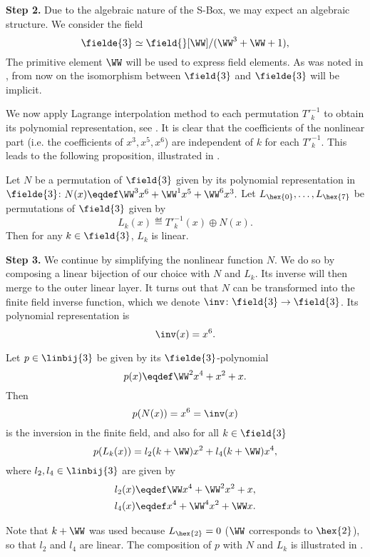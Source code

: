 \textbf{Step 2.}
Due to the algebraic nature of the S-Box, we may expect an algebraic structure. We consider the field
$$
\fielde{3} \simeq \field{}[\WW]/(\WW^3+\WW+1),
$$
The primitive element $\WW$ will be used to express field elements. As was noted in , from now on the isomorphism between $\field{3}$ and $\fielde{3}$ will be implicit.


We now apply Lagrange interpolation method to each permutation $T'^{-1}_k$ to obtain its polynomial representation, see . It is clear that the coefficients of the nonlinear part (i.e. the coefficients of $x^3, x^5, x^6$) are independent of $k$ for each $T'^{-1}_k$. This leads to the following proposition, illustrated in .

\begin{proposition}
Let $N$ be a permutation of $\field{3}$ given by its polynomial representation in $\fielde{3}$:
$N(x) \eqdef \WW^3x^6 + \WW^1x^5 + \WW^6x^3.$
Let $L_{\hex{0}},\dots,L_{\hex{7}}$ be permutations of $\field{3}$ given by
$$
L_k(x) \eqdef T'^{-1}_k(x) \oplus N(x).
$$
Then for any $k\in \field{3}$, $L_k$ is linear.
\end{proposition}

\textbf{Step 3.}
We continue by simplifying the nonlinear function $N$. We do so by composing a linear bijection of our choice with $N$ and $L_k$. Its inverse will then merge to the outer linear layer. It turns out that $N$ can be transformed into the finite field inverse function, which we denote $\inv\colon \field{3} \to \field{3}$. Its polynomial representation is
$$
\inv(x) = x^6.
$$

\begin{proposition}
Let $p \in \linbij{3}$ be given by its $\fielde{3}$-polynomial
$$
p(x) \eqdef \WW^2x^4 + x^2 + x.
$$
Then
$$
p(N(x)) = x^6 = \inv(x)
$$ is the inversion in the finite field, and also for all $k \in \field{3}$
$$
p(L_k(x)) = l_2(k+\WW)x^2 + l_4(k+\WW)x^4,
$$
where $l_2,l_4 \in \linbij{3}$ are given by
\begin{align*}
l_2(x) &\eqdef \WW x^4 + \WW^2x^2 + x, \\
l_4(x) &\eqdef x^4 + \WW^4x^2 + \WW x.
\end{align*}
\end{proposition}

Note that $k+\WW$ was used because $L_{\hex{2}} = 0$ ($\WW$ corresponds to $\hex{2}$), so that $l_2$ and $l_4$ are linear. The composition of $p$ with $N$ and $L_k$ is illustrated in .

